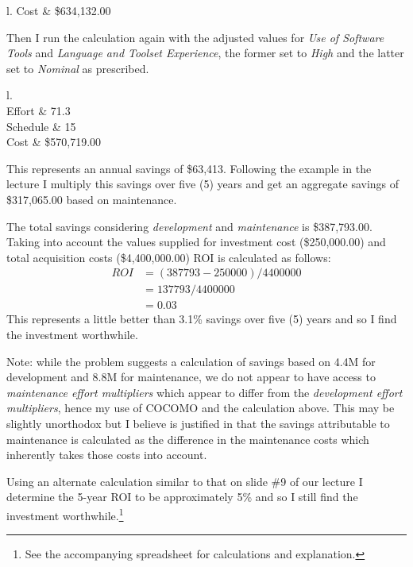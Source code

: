 \documentclass[letterpaper,10pt]{article}
\begin{document}
\begin{enumerate}
\begin{center}
\begin{tabular}{l.}
			Cost & \$634,132.00 \\
			\hline
		\end{tabular}
	\end{center}
	Then I run the calculation again with the adjusted values for \emph{Use of Software Tools} and \emph{Language and Toolset Experience}, the former set to \emph{High} and the latter set to \emph{Nominal} as prescribed.
	\begin{center}
		\begin{tabular}{l.}
			\hline \\
			Effort & 71.3 \\
			Schedule & 15 \\
			Cost & \$570,719.00 \\
			\hline
		\end{tabular}
	\end{center}
	This represents an annual savings of \$63,413.  Following the example in the lecture I multiply this savings over five (5) years and get an aggregate savings of \$317,065.00 based on maintenance.
	\par
	The total savings considering \emph{development} and \emph{maintenance} is \$387,793.00.  Taking into account the values supplied for investment cost (\$250,000.00) and total acquisition costs (\$4,400,000.00) ROI is calculated as follows:
	\begin{align*}
	ROI &= (387793 - 250000) / 4400000 \\
	&= 137793 / 4400000 \\
	&= 0.03
	\end{align*}
	This represents a little better than 3.1\% savings over five (5) years and so I find the investment worthwhile.
	\par
	Note: while the problem suggests a calculation of savings based on 4.4M for development and 8.8M for maintenance, we do not appear to have access to \emph{maintenance effort multipliers} which appear to differ from the \emph{development effort multipliers}, hence my use of COCOMO and the calculation above.  This may be slightly unorthodox but I believe is justified in that the savings attributable to maintenance is calculated as the difference in the maintenance costs which inherently takes those costs into account.
	\par
	Using an alternate calculation similar to that on slide \#9 of our lecture I determine the 5-year ROI to be approximately 5\% and so I still find the investment worthwhile.\footnote{See the accompanying spreadsheet for calculations and explanation.}
\end {enumerate}
\end{document}
